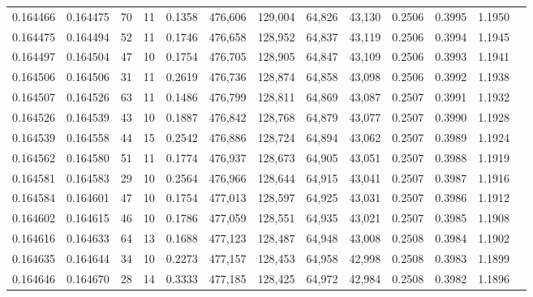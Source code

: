 \begin{tabular}{rrrrrrrrrrrrr}
0.164466 & 0.164475 &    70 &  11 &                                     0.1358 & 476,606 & 129,004 &  64,826 &  43,130 & 0.2506 & 0.3995 & 1.1950 \\
0.164475 & 0.164494 &    52 &  11 &                                     0.1746 & 476,658 & 128,952 &  64,837 &  43,119 & 0.2506 & 0.3994 & 1.1945 \\
0.164497 & 0.164504 &    47 &  10 &                                     0.1754 & 476,705 & 128,905 &  64,847 &  43,109 & 0.2506 & 0.3993 & 1.1941 \\
0.164506 & 0.164506 &    31 &  11 &                                     0.2619 & 476,736 & 128,874 &  64,858 &  43,098 & 0.2506 & 0.3992 & 1.1938 \\
0.164507 & 0.164526 &    63 &  11 &                                     0.1486 & 476,799 & 128,811 &  64,869 &  43,087 & 0.2507 & 0.3991 & 1.1932 \\
0.164526 & 0.164539 &    43 &  10 &                                     0.1887 & 476,842 & 128,768 &  64,879 &  43,077 & 0.2507 & 0.3990 & 1.1928 \\
0.164539 & 0.164558 &    44 &  15 &                                     0.2542 & 476,886 & 128,724 &  64,894 &  43,062 & 0.2507 & 0.3989 & 1.1924 \\
0.164562 & 0.164580 &    51 &  11 &                                     0.1774 & 476,937 & 128,673 &  64,905 &  43,051 & 0.2507 & 0.3988 & 1.1919 \\
0.164581 & 0.164583 &    29 &  10 &                                     0.2564 & 476,966 & 128,644 &  64,915 &  43,041 & 0.2507 & 0.3987 & 1.1916 \\
0.164584 & 0.164601 &    47 &  10 &                                     0.1754 & 477,013 & 128,597 &  64,925 &  43,031 & 0.2507 & 0.3986 & 1.1912 \\
0.164602 & 0.164615 &    46 &  10 &                                     0.1786 & 477,059 & 128,551 &  64,935 &  43,021 & 0.2507 & 0.3985 & 1.1908 \\
0.164616 & 0.164633 &    64 &  13 &                                     0.1688 & 477,123 & 128,487 &  64,948 &  43,008 & 0.2508 & 0.3984 & 1.1902 \\
0.164635 & 0.164644 &    34 &  10 &                                     0.2273 & 477,157 & 128,453 &  64,958 &  42,998 & 0.2508 & 0.3983 & 1.1899 \\
0.164646 & 0.164670 &    28 &  14 &                                     0.3333 & 477,185 & 128,425 &  64,972 &  42,984 & 0.2508 & 0.3982 & 1.1896 \\

\end{tabular}
